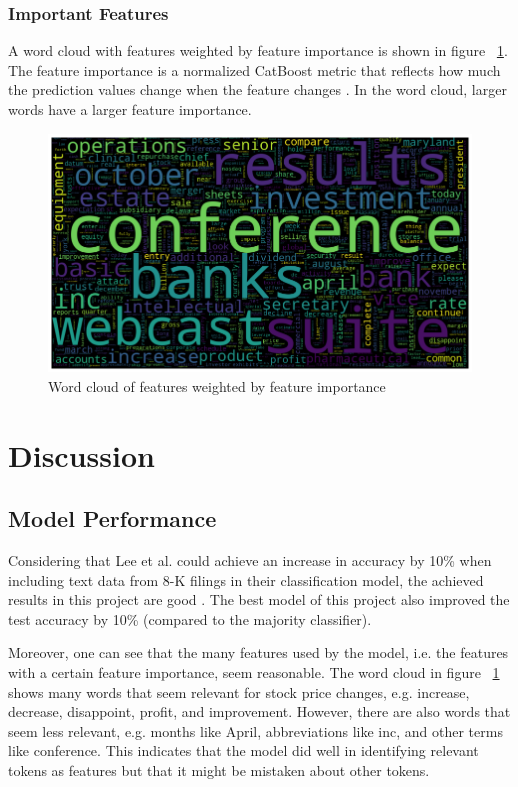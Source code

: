 \documentclass{article}
\begin{document}
	\newpage
	\subsubsection{Important Features}
	
	A word cloud with features weighted by feature importance is shown in figure ~\ref{fig:feat_imp}. The feature importance is a normalized CatBoost metric that reflects how much the prediction values change when the feature changes \cite{noauthor_feature_nodate}. In the word cloud, larger words have a larger feature importance.
	
	\begin{figure}[h!]
		\includegraphics[width=\linewidth]{img/feat_imp.png}
		\caption{Word cloud of features weighted by feature importance}
		\label{fig:feat_imp}
	\end{figure}
	
	
	\section{Discussion}
	
	\subsection{Model Performance}
	
	Considering that Lee et al. could achieve an increase in accuracy by 10\% when including text data from 8-K filings in their classification model, the achieved results in this project are good \cite{lee_importance_2014}. The best model of this project also improved the test accuracy by 10\% (compared to the majority classifier). 
	
	Moreover, one can see that the many features used by the model, i.e. the features with a certain feature importance, seem reasonable. The word cloud in figure ~\ref{fig:feat_imp} shows many words that seem relevant for stock price changes, e.g. increase, decrease, disappoint, profit, and improvement. However, there are also words that seem less relevant, e.g. months like April, abbreviations like inc, and other terms like conference. This indicates that the model did well in identifying relevant tokens as features but that it might be mistaken about other tokens.
	
\end{document}
